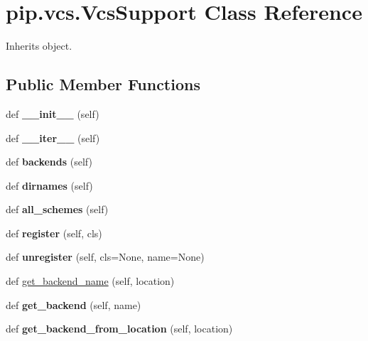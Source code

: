 \hypertarget{classpip_1_1vcs_1_1_vcs_support}{}\section{pip.\+vcs.\+Vcs\+Support Class Reference}
\label{classpip_1_1vcs_1_1_vcs_support}


Inherits object.

\subsection*{Public Member Functions}
\begin{DoxyCompactItemize}
\item 
\mbox{\label{classpip_1_1vcs_1_1_vcs_support_ad149606eed3f38b467d9079004c48bf6}} 
def {\bfseries \+\_\+\+\_\+init\+\_\+\+\_\+} (self)
\item 
\mbox{\label{classpip_1_1vcs_1_1_vcs_support_a0696b8cbfb94e452f670ba6e25b5390e}} 
def {\bfseries \+\_\+\+\_\+iter\+\_\+\+\_\+} (self)
\item 
\mbox{\label{classpip_1_1vcs_1_1_vcs_support_a1e8e36827b5b4fed261efe4ca802d836}} 
def {\bfseries backends} (self)
\item 
\mbox{\label{classpip_1_1vcs_1_1_vcs_support_a06431d2d80b178c5439022f8eb713df7}} 
def {\bfseries dirnames} (self)
\item 
\mbox{\label{classpip_1_1vcs_1_1_vcs_support_a796c6619733d08fe0b22f663d56c9762}} 
def {\bfseries all\+\_\+schemes} (self)
\item 
\mbox{\label{classpip_1_1vcs_1_1_vcs_support_ab41ae402607a3277c9a44abadc730a1e}} 
def {\bfseries register} (self, cls)
\item 
\mbox{\label{classpip_1_1vcs_1_1_vcs_support_ab00c34fcb3a773be4dc0a035d263ab84}} 
def {\bfseries unregister} (self, cls=None, name=None)
\item 
def \hyperlink{classpip_1_1vcs_1_1_vcs_support_a6487ce924995420bae7582270c09a02a}{get\+\_\+backend\+\_\+name} (self, location)
\item 
\mbox{\label{classpip_1_1vcs_1_1_vcs_support_a45e84d524ea75800ea88a6180175c73f}} 
def {\bfseries get\+\_\+backend} (self, name)
\item 
\mbox{\label{classpip_1_1vcs_1_1_vcs_support_a9b18d97e1cadc1654e1191967a0bff22}} 
def {\bfseries get\+\_\+backend\+\_\+from\+\_\+location} (self, location)
\end{DoxyCompactItemize}
